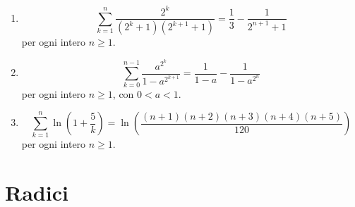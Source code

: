 \documentclass[11pt,a4paper]{article}
\begin{document}
\begin{enumerate}
{\small per ogni intero $n\ge 1$.}
\item \[ \sum_{k=1}^{n} \frac{2^{k}}{\left(2^{k} + 1\right)\left(2^{k + 1} + 1\right)} = \frac{1}{3} - \frac{1}{2^{n + 1} + 1} \]
{\small per ogni intero $n\ge 1$.}
\item \[ \sum_{k=0}^{n - 1} \frac{a^{2^{k}}}{1 - a^{2^{k + 1}}} = \frac{1}{1 - a} - \frac{1}{1 - a^{2^{n}}} \]
{\small per ogni intero $n\ge 1$, con $0<a<1$.}
\item \[ \sum_{k=1}^{n} \ln\left(1 + \frac{5}{k}\right) = \ln\left(\frac{\left(n + 1\right)\left(n + 2\right)\left(n + 3\right)\left(n + 4\right)\left(n + 5\right)}{120}\right) \]
{\small per ogni intero $n\ge 1$.}
\end{enumerate}

\section*{Radici}
\end{document}
